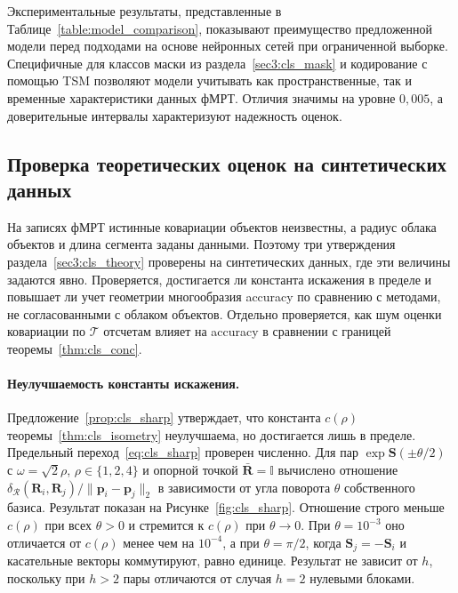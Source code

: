 Экспериментальные результаты, представленные в Таблице~\ref{table:model_comparison}, показывают преимущество предложенной модели перед подходами на основе нейронных сетей при ограниченной выборке. Специфичные для классов маски из раздела~\ref{sec3:cls_mask} и кодирование с помощью TSM позволяют модели учитывать как пространственные, так и временные характеристики данных фМРТ. Отличия значимы на уровне $0{,}005$, а доверительные интервалы характеризуют надежность оценок.

\subsection{Проверка теоретических оценок на синтетических данных}\label{sec4:cls_synth}

На записях фМРТ истинные ковариации объектов неизвестны, а радиус облака объектов и длина сегмента заданы данными. Поэтому три утверждения раздела~\ref{sec3:cls_theory} проверены на синтетических данных, где эти величины задаются явно. Проверяется, достигается ли константа искажения в пределе и повышает ли учет геометрии многообразия accuracy по сравнению с методами, не согласованными с облаком объектов. Отдельно проверяется, как шум оценки ковариации по $\mathcal{T}$ отсчетам влияет на accuracy в сравнении с границей теоремы~\ref{thm:cls_conc}.

\paragraph{Неулучшаемость константы искажения.}\label{sec4:cls_sharp} Предложение~\ref{prop:cls_sharp} утверждает, что константа $c(\rho)$ теоремы~\ref{thm:cls_isometry} неулучшаема, но достигается лишь в пределе. Предельный переход~\eqref{eq:cls_sharp} проверен численно. Для пар $\exp\mathbf{S}(\pm\theta/2)$ с $\omega = \sqrt{2}\rho$, $\rho \in \{1, 2, 4\}$ и опорной точкой $\bar{\mathbf{R}} = \mathbb{I}$ вычислено отношение $\delta_{\mathcal{R}}(\mathbf{R}_i, \mathbf{R}_j) / \|\mathbf{p}_i - \mathbf{p}_j\|_2$ в зависимости от угла поворота $\theta$ собственного базиса. Результат показан на Рисунке~\ref{fig:cls_sharp}. Отношение строго меньше $c(\rho)$ при всех $\theta > 0$ и стремится к $c(\rho)$ при $\theta \to 0$. При $\theta = 10^{-3}$ оно отличается от $c(\rho)$ менее чем на $10^{-4}$, а при $\theta = \pi/2$, когда $\mathbf{S}_j = -\mathbf{S}_i$ и касательные векторы коммутируют, равно единице. Результат не зависит от $h$, поскольку при $h > 2$ пары отличаются от случая $h = 2$ нулевыми блоками.

